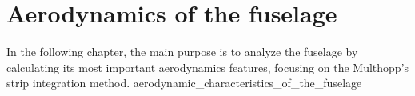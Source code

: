 \documentclass[[12pt,twoside]{book}
\begin{document}
%
%
\chapter%
   [Aerodynamics of the fuselage ]%
   {Aerodynamics of the fuselage }
\label{chap:Wing}

\setcounter{minitocdepth}{2}%
\minitoc %

\vspace{\baselineskip}

\noindent
In the following chapter, the main purpose is to analyze the fuselage by calculating its most important aerodynamics features, focusing on the Multhopp’s strip integration method. 
%
{aerodynamic_characteristics_of_the_fuselage}
\end{document}
